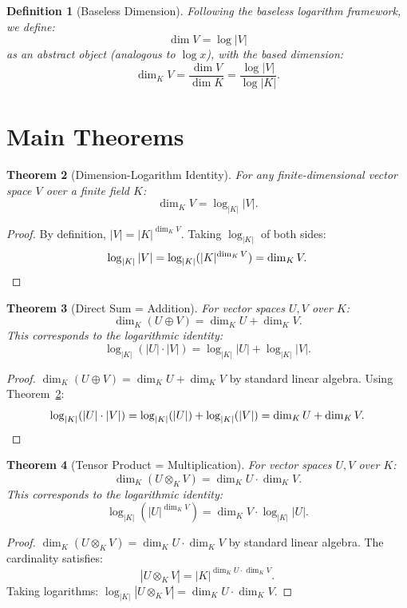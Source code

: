 \documentclass[11pt]{article}
\newtheorem{definition}{Definition}[section]
\newtheorem{theorem}[definition]{Theorem}
\begin{document}
\begin{definition}[Baseless Dimension]
Following the baseless logarithm framework, we define:
\[
\dim V = \log |V|
\]
as an abstract object (analogous to $\log x$), with the based dimension:
\[
\dim_K V = \frac{\dim V}{\dim K} = \frac{\log |V|}{\log |K|}.
\]
\end{definition}

\section{Main Theorems}
\label{sec:theorems}

\begin{theorem}[Dimension-Logarithm Identity]
\label{thm:main}
For any finite-dimensional vector space $V$ over a finite field $K$:
\[
\dim_K V = \log_{|K|} |V|.
\]
\end{theorem}

\begin{proof}
By definition, $|V| = |K|^{\dim_K V}$. Taking $\log_{|K|}$ of both sides:
\[
\log_{|K|} |V| = \log_{|K|} (|K|^{\dim_K V}) = \dim_K V. \qedhere
\]
\end{proof}

\begin{theorem}[Direct Sum = Addition]
\label{thm:directsum}
For vector spaces $U, V$ over $K$:
\[
\dim_K(U \oplus V) = \dim_K U + \dim_K V.
\]
This corresponds to the logarithmic identity:
\[
\log_{|K|}(|U| \cdot |V|) = \log_{|K|} |U| + \log_{|K|} |V|.
\]
\end{theorem}

\begin{proof}
$\dim_K(U \oplus V) = \dim_K U + \dim_K V$ by standard linear algebra. Using Theorem~\ref{thm:main}:
\[
\log_{|K|}(|U| \cdot |V|) = \log_{|K|}(|U|) + \log_{|K|}(|V|) = \dim_K U + \dim_K V. \qedhere
\]
\end{proof}

\begin{theorem}[Tensor Product = Multiplication]
\label{thm:tensor}
For vector spaces $U, V$ over $K$:
\[
\dim_K(U \otimes_K V) = \dim_K U \cdot \dim_K V.
\]
This corresponds to the logarithmic identity:
\[
\log_{|K|}(|U|^{\dim_K V}) = \dim_K V \cdot \log_{|K|} |U|.
\]
\end{theorem}

\begin{proof}
$\dim_K(U \otimes_K V) = \dim_K U \cdot \dim_K V$ by standard linear algebra. The cardinality satisfies:
\[
|U \otimes_K V| = |K|^{\dim_K U \cdot \dim_K V}.
\]
Taking logarithms: $\log_{|K|} |U \otimes_K V| = \dim_K U \cdot \dim_K V$.
\end{proof}
\end{document}
